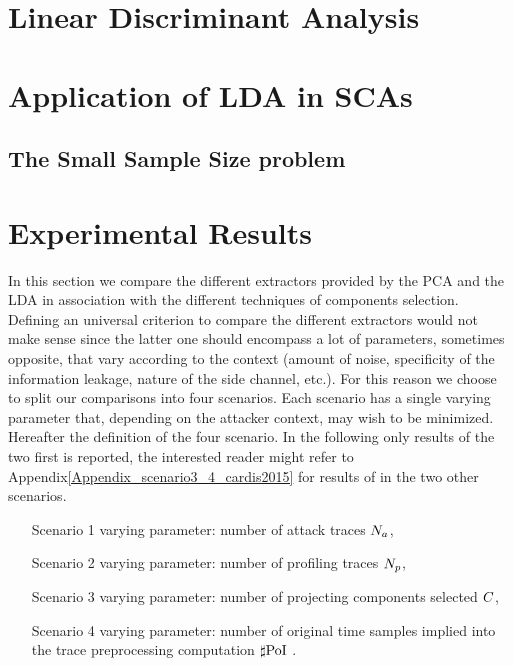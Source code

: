 
\section{Linear Discriminant Analysis}\label{sec:LDA}



\section{Application of LDA in SCAs}\label{sec:LDA_SCA}
\subsection{The Small Sample Size problem}





\section{Experimental Results}\label{sec:experiments}

In this section we compare the different extractors provided by the PCA and the LDA in association with the different techniques  of components selection. Defining an universal criterion to compare the different extractors would not make sense since the latter one should encompass a lot of parameters, sometimes opposite, that vary according to the context (amount of noise, specificity of the information leakage, nature of the side channel, etc.). For this reason we choose to split our comparisons into four scenarios. Each scenario has a single varying parameter that, depending on the attacker context, may wish to be minimized. Hereafter the definition of the four scenario. In the following only results of the two first is reported, the interested reader might refer to Appendix\ref{Appendix_scenario3_4_cardis2015} for results of in the two other scenarios.  
\begin{itemize}
\item[Scenario 1] varying parameter: number of attack traces $N_a$, 
\item[Scenario 2] varying parameter: number of profiling traces $N_p$, 
\item[Scenario 3] varying parameter: number of projecting components selected $C$,
\item[Scenario 4] varying parameter: number of original time samples implied into the trace preprocessing computation $\sharp\mathrm{PoI}$ .
\end{itemize}
 
